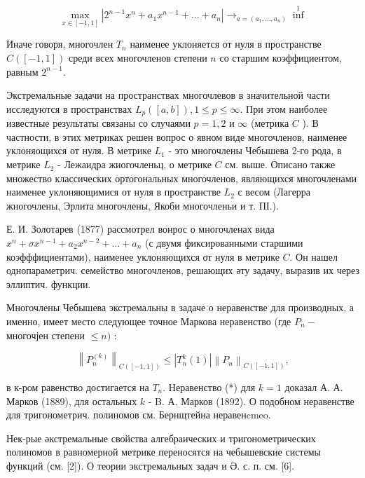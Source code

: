 \documentclass[10pt]{article}
\begin{document}
\[

\max _{x \in[-1,1]}\left|2^{n-1} x^{n}+a_{1} x^{n-1}+\ldots+a_{n}\right| \longrightarrow_{a=\left(a_{1}, \ldots, a_{n}\right)} \inf ^{1}

\]



Иначе говоря, многочлен $T_{n}$ наименее уклоняется от нуля в пространстве $C([-1,1])$ среди всех многочленов степени $n$ со старшим коэффициентом, равным $2^{n-1}$.



Экстремальные задачи на пространствах многочлевов в значительной части исследуются в пространствах $L_{p}([a, b]), 1 \leqslant p \leqslant \infty$. При этом наиболее известные результаты связаны со случаями $p=1,2$ и $\infty$ (метрика $C$ ). В частности, в этих метриках решен вопрос о явном виде многочленов, наименее уклоняощихся от нуля. В метрике $L_{1}$ - это многочлены Чебышева 2-го рода, в метрике $L_{2}$ - Лежаидра жиогочленьц, о метрике $C$ см. выше. Описано также множество классических ортогональных многочленов, являющихся многочленами наименее уклоняющимися от нуля в пространстве $L_{2}$ с весом (Лагерра жногочлены, Эрлита многочлены, Якоби многочленьи и т. ПІ.).



Е. И. Золотарев (1877) рассмотрел вонрос о многочленах вида $x^{n}+\sigma x^{n-1}+a_{2} x^{n-2}+\ldots+a_{n}$ (с двумя фиксированными старшими коэфффициентами), наименее уклоняющихся от нуля в метрике $C$. Он нашел однопараметрич. семейство многочленов, решающих әту задачу, выразив их через эллиптич. функции.



Многочлены Чебышева экстремальны в задаче о неравенстве для производных, а именно, имеет место следующее точное Маркова неравенство (где $P_{n}-$ многочјен степени $\leqslant n)$ :



\[

\left\|P_{n}^{(k)}\right\|_{C([-1,1])} \leqslant\left|T_{n}^{k}(1)\right|\left\|P_{n}\right\|_{C([-1,1])},

\]



в к-ром равенство достигается на $T_{n}$. Неравенство (*) для $k=1$ доказал А. А. Марков (1889), для остальных $k$ - B. А. Марков (1892). О подобном неравенстве для тригонометрич. полиномов см. Бернщтейна неравенcmeo.



Нек-рые әкстремальные свойства алгебраических и тригонометрических полиномов в равномерной метрике переносятся на чебышевские системы функций (см. [2]). О теории экстремальных задач и Ә. с. п. см. [6].
\end{document}
